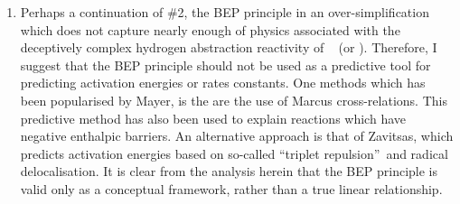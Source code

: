 \begin{enumerate}
\item Perhaps a continuation of \#2, the BEP principle in an over-simplification which does not capture nearly enough of physics associated with the deceptively complex hydrogen abstraction reactivity of \cumo~ (or ). Therefore, I suggest that the BEP principle should not be used as a predictive tool for predicting activation energies or rates constants. One methods which has been popularised by Mayer, is the are the use of Marcus cross-relations.\cite{Mayer2010} This predictive method has also been used to explain reactions which have negative enthalpic barriers.\cite{Mader2004} An alternative approach is that of Zavitsas, which predicts activation energies based on so-called ``triplet repulsion''\footnotemark\ and radical delocalisation.\cite{Zavitsas1995, Zavitsas2012} It is clear from the analysis herein that the BEP principle is valid only as a conceptual framework, rather than a true linear relationship.
\end{enumerate}

